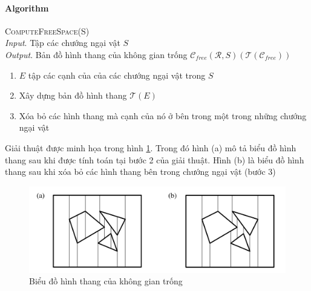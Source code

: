 \documentclass[a4paper,12pt]{report}
\begin{document}
\paragraph{Algorithm} \textsc{ComputeFreeSpace(S)}\\
\emph{Input}. Tập các chướng ngại vật $S$\\
\emph{Output}. Bản đồ hình thang của không gian trống $\mathcal{C}_{free}(\mathcal{R},S) (\mathcal{T}(\mathcal{C}_{free}))$
\begin{enumerate}
\item $E$ tập các cạnh của của các chướng ngại vật trong $S$
\item Xây dựng bản đồ hình thang $\mathcal{T}(E)$
\item Xóa bỏ các hình thang mà cạnh của nó ở bên trong một trong những chướng ngại vật 
\end{enumerate}

Giải thuật được minh họa trong hình \ref{fig_trapezoidal_free_space}. Trong đó hình (a) mô tả biểu đồ hình thang sau khi được tính toán tại bước 2 của giải thuật. Hình (b) là biểu đồ hình thang sau khi xóa bỏ các hình thang bên trong chướng ngại vật (bước 3)
\begin{figure}[H]
\centering
\includegraphics[scale=0.3]{trapezoidal_free_space.png}
\caption{Biểu đồ hình thang của không gian trống}
\label{fig_trapezoidal_free_space}
\end{figure}
\end{document}

